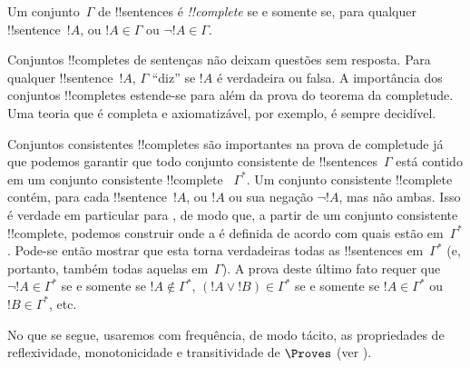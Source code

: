 \documentclass[../../../include/open-logic-section]{subfiles}
\begin{document}
      {}
      {}
      

\begin{defn}
 Um conjunto~$\Gamma$ de !!{sentence}s é
\emph{!!{complete}} se e somente se, para qualquer !!{sentence}~$!A$, ou $!A \in
\Gamma$ ou $\lnot !A \in \Gamma$.
\end{defn}

\begin{explain}
Conjuntos !!{complete}s de sentenças não deixam questões sem resposta. Para
qualquer !!{sentence}~$!A$, $\Gamma$ ``diz'' se $!A$ é verdadeira ou falsa.  A
importância dos conjuntos !!{complete}s estende-se para além da prova do
teorema da completude. Uma teoria que é completa e
axiomatizável, por exemplo, é sempre decidível.
\end{explain}

\begin{explain}
Conjuntos consistentes !!{complete}s são importantes na prova de completude
já que podemos garantir que todo conjunto consistente de
!!{sentence}s~$\Gamma$ está contido em um conjunto consistente !!{complete}
~$\Gamma^*$.  Um conjunto consistente !!{complete} contém, para cada
!!{sentence}~$!A$, ou $!A$ ou sua negação $\lnot !A$, mas não
ambas. Isso é verdade em particular para , de modo que, a partir de um conjunto consistente
!!{complete}, podemos construir
 onde a
 é definida de acordo com quais
 estão
em~$\Gamma^*$. Pode-se então mostrar que esta
 torna verdadeiras todas as
!!{sentence}s em~$\Gamma^*$ (e, portanto, também todas
aquelas em~$\Gamma$). A prova deste último fato requer que
$\lnot !A \in \Gamma^*$ se e somente se $!A \notin \Gamma^*$, $(!A \lor !B) \in
\Gamma^*$ se e somente se $!A \in \Gamma^*$ ou $!B \in \Gamma^*$, etc.
\end{explain}

No que se segue, usaremos com frequência, de modo tácito, as propriedades de
reflexividade, monotonicidade e transitividade de $\Proves$ (ver
).
\end{document}
